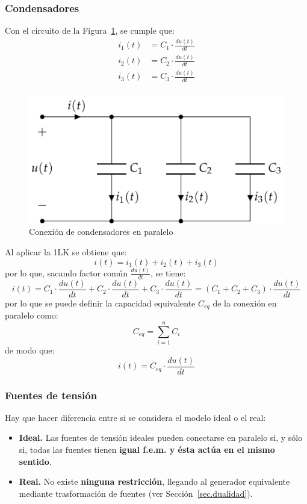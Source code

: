		\subsubsection{Condensadores} 
		Con el circuito de la Figura~\ref{fig.condensadores-paralelo}, se cumple que:
		\begin{align*}
			i_1(t) &= C_1 \cdot \frac{du(t)}{dt}\\
			i_2(t) &= C_2 \cdot \frac{du(t)}{dt}\\
			i_3(t) &= C_3 \cdot \frac{du(t)}{dt}\\
		\end{align*}
		\begin{figure}[H]
			\centering
			\includegraphics[width=0.4\linewidth]{../figs/CondensadoresParalelo.pdf}
			\caption{Conexión de condensadores en paralelo}
			\label{fig.condensadores-paralelo}
		\end{figure}
		Al aplicar la 1LK se obtiene que: 
		\begin{equation*}
			i(t) = i_1(t) + i_2(t) + i_3(t)
		\end{equation*}
		por lo que, sacando factor común $\frac{du(t)}{dt}$, se tiene:
		\begin{equation*}
			i(t)=C_1\cdot \dfrac{du(t)}{dt}+ C_2\cdot \dfrac{du(t)}{dt}+ C_3\cdot \dfrac{du(t)}{dt}=(C_1+C_2+C_3)\cdot\dfrac{du(t)}{dt}
		\end{equation*}
		por lo que se puede definir la capacidad equivalente $C_{eq}$ de la conexión en paralelo como:
		\begin{equation}
			\boxed{C_{eq} = \sum_{i = 1}^n C_i}
		\end{equation}
		de modo que:
		\begin{equation*}
			i(t) = C_{eq} \cdot \frac{du(t)}{dt}
		\end{equation*}
		
		\subsubsection{Fuentes de tensión}
		
		Hay que hacer diferencia entre si se considera el modelo ideal o el real:
		\begin{itemize}
			\item \textbf{Ideal.} Las fuentes de tensión ideales pueden conectarse en paralelo si, y sólo si, todas las fuentes tienen \textbf{igual f.e.m. y ésta actúa en el mismo sentido}.
			\item \textbf{Real.} No existe \textbf{ninguna restricción}, llegando al generador equivalente mediante trasformación de fuentes (ver Sección~\ref{sec.dualidad}). 
		\end{itemize}
		
